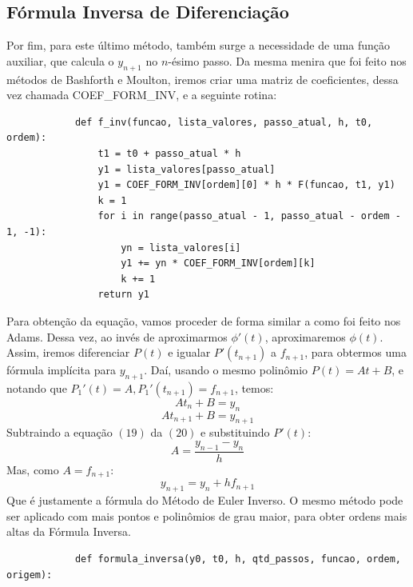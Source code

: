 \documentclass{article}
\begin{document}
\begin{otherlanguage}{brazil}
    \subsection{Fórmula Inversa de Diferenciação}
        Por fim, para este último método, também surge a necessidade de uma função auxiliar, que calcula o $y_{n+1}$ no $n$-ésimo passo. Da mesma menira que foi feito nos métodos de Bashforth e Moulton, iremos criar uma matriz de coeficientes, dessa vez chamada COEF\_FORM\_INV, e a seguinte rotina:
        \begin{lstlisting}
            def f_inv(funcao, lista_valores, passo_atual, h, t0, ordem):
                t1 = t0 + passo_atual * h
                y1 = lista_valores[passo_atual]
                y1 = COEF_FORM_INV[ordem][0] * h * F(funcao, t1, y1)
                k = 1
                for i in range(passo_atual - 1, passo_atual - ordem - 1, -1):
                    yn = lista_valores[i]
                    y1 += yn * COEF_FORM_INV[ordem][k]
                    k += 1
                return y1
        \end{lstlisting}
        Para obtenção da equação, vamos proceder de forma similar a como foi feito nos Adams. Dessa vez, ao invés de aproximarmos $\phi'(t)$, aproximaremos $\phi(t)$. Assim, iremos diferenciar $P(t)$ e igualar $P'(t_{n+1})$ a $f_{n+1}$, para obtermos uma fórmula implícita para $y_{n+1}$. Daí, usando o mesmo polinômio $P(t) = At + B$, e notando que $P_{1}'(t) = A, P_{1}'(t_{n+1}) = f_{n+1}$, temos:
        \begin{equation}
            At_n + B = y_n
        \end{equation}
        \begin{equation}
            At_{n+1} + B = y_{n+1}
        \end{equation}
            Subtraindo a equação $(19)$ da $(20)$ e substituindo $P'(t)$:
        \begin{equation}
            A = \frac{y_{n-1} - y_n}{h}
        \end{equation}
            Mas, como $A = f_{n+1}$:
        \begin{equation}
            y_{n+1} = y_n + hf_{n+1}
        \end{equation}
            Que é justamente a fórmula do Método de Euler Inverso. O mesmo método pode ser aplicado com mais pontos e polinômios de grau maior, para obter ordens mais altas da Fórmula Inversa.
        \begin{lstlisting}
            def formula_inversa(y0, t0, h, qtd_passos, funcao, ordem, origem):

\end{lstlisting}
\end{otherlanguage}
\end{document}
